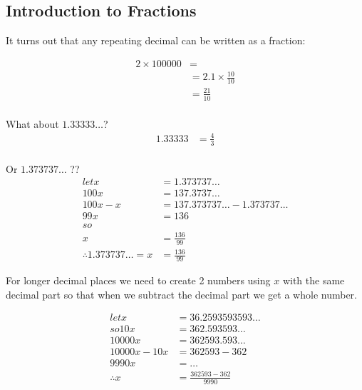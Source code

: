 \newpage
\subsection{Introduction to Fractions}
\label{sec:IntroductionToFractions}
It turns out that any repeating decimal can be written as a fraction:

\begin{align}
  2 \times 100000 & = \\
    & = 2.1 \times \frac{10}{10} \\
    & = \frac{21}{10} \\
\end{align}

What about $1.33333\ldots$?
\begin{align}
  1.33333 & = \frac{4}{3} \\
\end{align}

Or $1.373737\ldots$ ??
\begin{align}
  let     x & = 1.373737\ldots\\
       100x & = 137.3737\ldots\\
   100x - x & = 137.373737\ldots - 1.373737\ldots\\
        99x & = 136 \\
  so \nonumber \\
        x & = \frac{136}{99} \\
        \therefore 1.373737\ldots = x & = \frac{136}{99}  
\end{align}

For longer decimal places we need to create 2 numbers using $x$ with the same
decimal part so that when we subtract the decimal part we get a whole number.

\begin{align}
         let  x & = 36.2593593593\ldots \\
       so 10x & = 362.593593\ldots \\
       10000x & = 362593.593\ldots \\
   10000x-10x & = 362593-362 \\
        9990x & = \ldots \\
 \therefore x & = \frac{362593 - 362}{9990} \\
\end{align}

